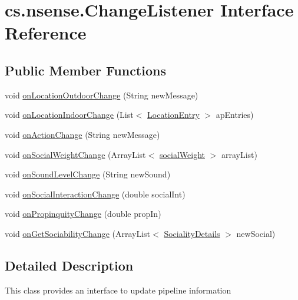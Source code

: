 \hypertarget{interfacecs_1_1nsense_1_1_change_listener}{\section{cs.\-nsense.\-Change\-Listener Interface Reference}
\label{interfacecs_1_1nsense_1_1_change_listener}
}
\subsection*{Public Member Functions}
\begin{DoxyCompactItemize}
\item 
void \hyperlink{interfacecs_1_1nsense_1_1_change_listener_aa565ab45a08f7a5d77f9478a206ba589}{on\-Location\-Outdoor\-Change} (String new\-Message)
\item 
void \hyperlink{interfacecs_1_1nsense_1_1_change_listener_a2881331c9a4b6b0c31aa3a52c3b0ae8f}{on\-Location\-Indoor\-Change} (List$<$ \hyperlink{classcs_1_1nsense_1_1location_1_1_location_entry}{Location\-Entry} $>$ ap\-Entries)
\item 
void \hyperlink{interfacecs_1_1nsense_1_1_change_listener_ae4b01cb3c4aab517f5c0752cdfb9882d}{on\-Action\-Change} (String new\-Message)
\item 
void \hyperlink{interfacecs_1_1nsense_1_1_change_listener_a04304593cd317eb80c6b4fbd8f8ee490}{on\-Social\-Weight\-Change} (Array\-List$<$ \hyperlink{classcs_1_1nsense_1_1bluetooth_1_1_bluetooth_core_1_1social_weight}{social\-Weight} $>$ array\-List)
\item 
void \hyperlink{interfacecs_1_1nsense_1_1_change_listener_afea10e550c775578f19a65b81ee44b64}{on\-Sound\-Level\-Change} (String new\-Sound)
\item 
void \hyperlink{interfacecs_1_1nsense_1_1_change_listener_a950164669dd0350e20d5baf14c46d3c9}{on\-Social\-Interaction\-Change} (double social\-Int)
\item 
void \hyperlink{interfacecs_1_1nsense_1_1_change_listener_a82b3519f8f730a9e5b003ff55687a58d}{on\-Propinquity\-Change} (double prop\-In)
\item 
void \hyperlink{interfacecs_1_1nsense_1_1_change_listener_a222a1629d871c23ba2966ada8be5308f}{on\-Get\-Sociability\-Change} (Array\-List$<$ \hyperlink{classcs_1_1nsense_1_1inference_module_1_1_sociality_details}{Sociality\-Details} $>$ new\-Social)
\end{DoxyCompactItemize}


\subsection{Detailed Description}
This class provides an interface to update pipeline information 

